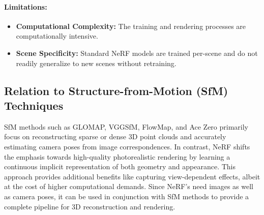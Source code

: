 \paragraph{Limitations:}
\begin{itemize}
    \item \textbf{Computational Complexity:} The training and rendering processes are computationally intensive.
    \item \textbf{Scene Specificity:} Standard NeRF models are trained per-scene and do not readily generalize to new scenes without retraining.
\end{itemize}

\subsection{Relation to Structure-from-Motion (SfM) Techniques}
SfM methods such as GLOMAP, VGGSfM, FlowMap, and Ace Zero primarily focus on reconstructing sparse or dense 3D point clouds and accurately estimating camera poses from image correspondences. 
In contrast, NeRF shifts the emphasis towards high-quality photorealistic rendering by learning a continuous implicit representation of both geometry and appearance. 
This approach provides additional benefits like capturing view-dependent effects, albeit at the cost of higher computational demands.
Since NeRF's need images as well as camera poses, it can be used in conjunction with SfM methods to provide a complete pipeline for 3D reconstruction and rendering.